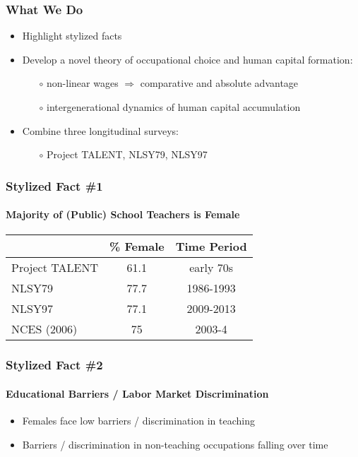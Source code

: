 \documentclass[11pt]{beamer}
\begin{document}
	\begin{frame}
		\frametitle{What We Do}
		\vfill
		\begin{itemize}
			\item Highlight stylized facts
			\vfill
			\item Develop a novel theory of occupational choice and human capital formation: 
			\begin{itemize}
				\item[$\circ$] non-linear wages $\Rightarrow$ comparative and absolute advantage
				\item[$\circ$] intergenerational dynamics of human capital accumulation
			\end{itemize}
			\vfill
			\item Combine three longitudinal surveys: 
			\begin{itemize}
				\item[$\circ$] Project TALENT, NLSY79, NLSY97
			\end{itemize}
		\end{itemize}
		\vfill
	\end{frame}
	
	\begin{frame}
		\frametitle{Stylized Fact \#1}
		\framesubtitle{Majority of (Public) School Teachers is Female}
		\begin{table}[h!]
			\centering 
			\begin{tabular}{l c c }
				\toprule
				& \% Female & Time Period \\
				\midrule
				Project TALENT  &  61.1 & early 70s \\
				NLSY79  & 77.7 & 1986-1993 \\
				NLSY97  & 77.1 & 2009-2013 \\
				\midrule
				NCES (2006) & 75 & 2003-4\\
				\bottomrule
			\end{tabular}
		\end{table}
	\end{frame}
	
	\begin{frame}
		\frametitle{Stylized Fact \#2}
		\framesubtitle{Educational Barriers / Labor Market Discrimination}
		\begin{itemize}
			\item Females face low barriers / discrimination in teaching
			\item Barriers / discrimination in non-teaching occupations falling over time
		\end{itemize}
	\end{frame}
	
\end{document}
